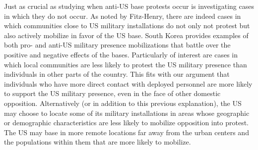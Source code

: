 		Just as crucial as studying when anti-US base protests occur is investigating cases in which they do not occur.  As noted by Fitz-Henry, there are indeed cases in which communities close to US military installations do not only not protest but also actively mobilize in favor of the US base.\cite{Fitz2015} South Korea provides examples of both pro- and anti-US military presence mobilizations that battle over the positive and negative effects of the bases. Particularly of interest are cases in which local communities are less likely to protest the US military presence than individuals in other parts of the country.  This fits with our argument that individuals who have more direct contact with deployed personnel are more likely to support the US military presence, even in the face of other domestic opposition.  Alternatively (or in addition to this previous explanation), the US may choose to locate some of its military installations in areas whose geographic or demographic characteristics are less likely to mobilize opposition into protest. The US may base in more remote locations far away from the urban centers and the populations within them that are more likely to mobilize. 
		
		
		
		
		
